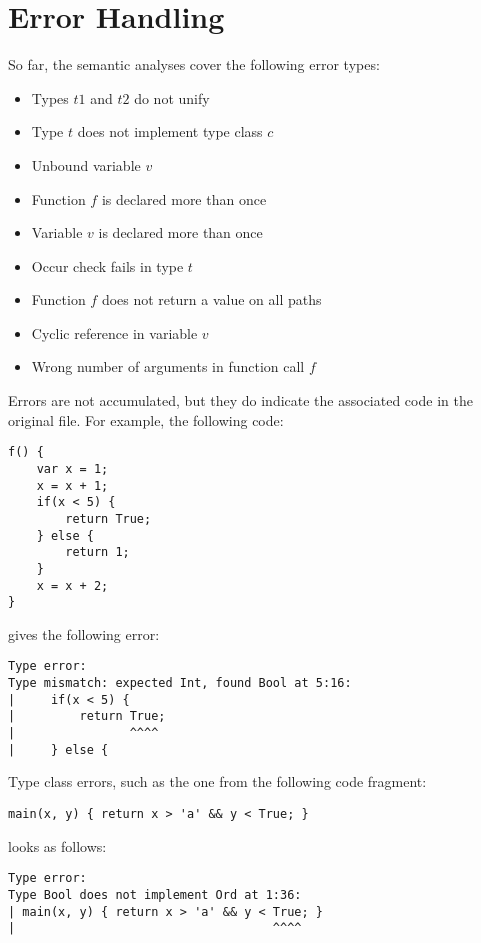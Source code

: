 \section{Error Handling}
So far, the semantic analyses cover the following error types:

\begin{itemize}
    \item Types $t1$ and $t2$ do not unify
    \item Type $t$ does not implement type class $c$
    \item Unbound variable $v$
    \item Function $f$ is declared more than once
    \item Variable $v$ is declared more than once
    \item Occur check fails in type $t$
    \item Function $f$ does not return a value on all paths
    \item Cyclic reference in variable $v$
    \item Wrong number of arguments in function call $f$
\end{itemize}

Errors are not accumulated, but they do indicate the associated code in the original file. For example, the following code:

\begin{lstlisting}
f() {
    var x = 1;
    x = x + 1;
    if(x < 5) {
        return True;
    } else {
        return 1;
    }
    x = x + 2;
}
\end{lstlisting}

gives the following error:

\begin{lstlisting}[language={}]
Type error:
Type mismatch: expected Int, found Bool at 5:16:
|     if(x < 5) {
|         return True;
|                ^^^^
|     } else {
\end{lstlisting}

Type class errors, such as the one from the following code fragment:

\begin{lstlisting}
main(x, y) { return x > 'a' && y < True; }
\end{lstlisting}

looks as follows:

\begin{lstlisting}[language={}]
Type error:
Type Bool does not implement Ord at 1:36:
| main(x, y) { return x > 'a' && y < True; }
|                                    ^^^^
\end{lstlisting}

